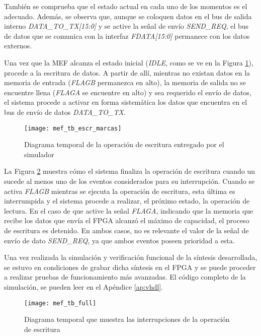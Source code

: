 También se comprueba que el estado actual en cada uno de los momentos es el adecuado. Además, se observa que, aunque se coloquen datos en el bus de salida interno {\it DATA\_TO\_TX[15:0]} y se active la señal de envío
{\it SEND\_REQ}, el bus de datos que se comunica con la interfaz {\it FDATA[15:0]} permanece con los datos externos.

Una vez que la MEF alcanza el estado inicial ({\it IDLE}, como se ve en la Figura \ref{tb:escr}), procede a la escritura de datos. A partir de allí, mientras no existan datos en la memoria de entrada ({\it FLAGB} permanezca en alto), la memoria de salida no se encuentre llena ({\it FLAGA} se encuentre en alto) y sea requerido el envío de datos, el sistema procede a activar en forma sistemática los datos que encuentra en el bus de envío de datos {\it DATA\_TO\_TX}.

\begin{figure}[t]
	\centering
	\texttt{[image: mef\_tb\_escr\_marcas]}
	\caption{Diagrama temporal de la operación de escritura entregado por el simulador}
	\label{tb:escr}
\end{figure}

La Figura \ref{tb:inter} muestra cómo el sistema finaliza la operación de escritura cuando un sucede al menos uno de los eventos considerados para su interrupción. Cuando se activa {\it FLAGB} mientras se ejecuta la operación de escritura, esta última es interrumpida y el sistema procede a realizar, el próximo estado, la operación de lectura. En el caso de que active la señal {\it FLAGA}, indicando que la memoria que recibe los datos que envía el FPGA alcanzó el máximo de capacidad, el proceso de escritura es detenido. En ambos casos, no es relevante el valor de la señal de envío de dato {\it SEND\_REQ}, ya que ambos eventos poseen prioridad a esta.
 
Una vez realizada la simulación y verificación funcional de la síntesis desarrollada, se estuvo en condiciones de grabar dicha síntesis en el FPGA y se puede proceder a realizar pruebas de funcionamiento más avanzadas. 
El código completo de la simulación, se pueden leer en el Apéndice \ref{ap:vhdl}.

\begin{figure}[h]
	\centering
	\texttt{[image: mef\_tb\_full]}
	\caption{Diagrama temporal que muestra las interrupciones de la operación de escritura}
	\label{tb:inter}
\end{figure}